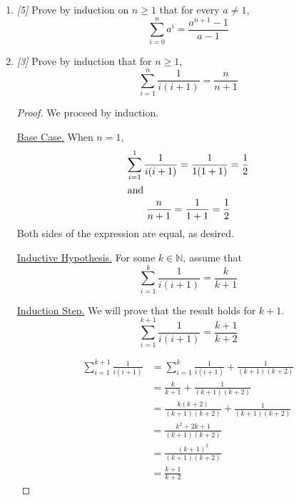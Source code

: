\documentclass[10pt, letterpaper]{article}
\numberwithin{equation}{section}
\begin{document}
\begin{enumerate}
        \item \textit{[5]} Prove by induction on $n \geq 1$ that for every $a \neq 1$,
        \begin{equation*}
            \sum_{i = 0}^{n} a^i = \frac{a^{n + 1} - 1}{a - 1}
        \end{equation*}

        \item \textit{[3]} Prove by induction that for $n \geq 1$,
        \begin{equation*}
            \sum_{i = 1}^{n} \frac{1}{i(i + 1)} = \frac{n}{n + 1}
        \end{equation*}

        \begin{proof}
            We proceed by induction.

            \underline{Base Case.} When $n = 1$,
            \begin{gather*}
                \sum_{i = 1}^{1} \frac{1}{i(i + 1)} = \frac{1}{1(1 + 1)} = \frac{1}{2} \\
                \intertext{and}
                \frac{n}{n + 1} = \frac{1}{1 + 1} = \frac{1}{2}
            \end{gather*}
            Both sides of the expression are equal, as desired.

            \underline{Inductive Hypothesis.} For some $k \in \mathbb{N}$, assume that
            \begin{equation*}
                \sum_{i = 1}^{k} \frac{1}{i(i + 1)} = \frac{k}{k + 1}
            \end{equation*}

            \underline{Induction Step.} We will prove that the result holds for $k + 1$.
            \begin{equation*}
                \sum_{i = 1}^{k + 1} \frac{1}{i(i + 1)} = \frac{k + 1}{k + 2}
            \end{equation*}

            \begin{align*}
                \sum_{i = 1}^{k + 1} \frac{1}{i(i + 1)} & =
                \sum_{i = 1}^{k} \frac{1}{i(i + 1)} + \frac{1}{(k + 1)(k + 2)} \\
                & = \frac{k}{k + 1} + \frac{1}{(k + 1)(k + 2)} \\
                & = \frac{k(k + 2)}{(k + 1)(k + 2)} + \frac{1}{(k + 1)(k + 2)} \\
                & = \frac{k^2 + 2k + 1}{(k + 1)(k + 2)} \\
                & = \frac{(k + 1)^2}{(k + 1)(k + 2)} \\
                & = \frac{k + 1}{k + 2}
            \end{align*}


\end{proof}
\end{enumerate}
\end{document}
